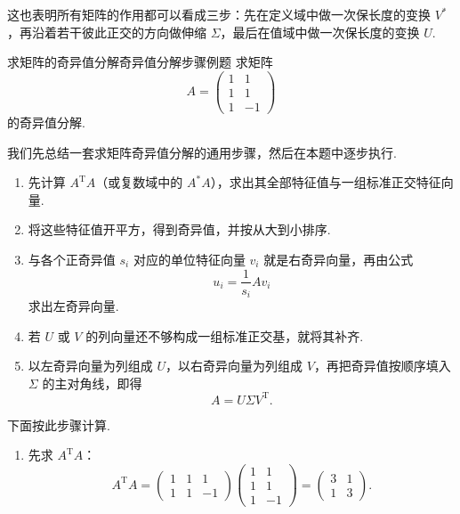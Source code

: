 这也表明所有矩阵的作用都可以看成三步：先在定义域中做一次保长度的变换 $ V^* $，再沿着若干彼此正交的方向做伸缩 $ \Sigma $，最后在值域中做一次保长度的变换 $ U $.

\begin{example}{求矩阵的奇异值分解}{奇异值分解步骤例题}
    求矩阵
    \[
        A = \begin{pmatrix}
            1 & 1  \\
            1 & 1  \\
            1 & -1
        \end{pmatrix}
    \]
    的奇异值分解.
\end{example}

\begin{solution}
    我们先总结一套求矩阵奇异值分解的通用步骤，然后在本题中逐步执行.

    \begin{enumerate}
        \item 先计算 $ A^{\mathrm{T}}A $（或复数域中的 $ A^*A $），求出其全部特征值与一组标准正交特征向量.

        \item 将这些特征值开平方，得到奇异值，并按从大到小排序.

        \item 与各个正奇异值 $ s_i $ 对应的单位特征向量 $ v_i $ 就是右奇异向量，再由公式
              \[
                  u_i = \frac{1}{s_i}Av_i
              \]
              求出左奇异向量.

        \item 若 $ U $ 或 $ V $ 的列向量还不够构成一组标准正交基，就将其补齐.

        \item 以左奇异向量为列组成 $ U $，以右奇异向量为列组成 $ V $，再把奇异值按顺序填入 $ \Sigma $ 的主对角线，即得
              \[
                  A = U\Sigma V^{\mathrm{T}}.
              \]
    \end{enumerate}

    下面按此步骤计算.

    \begin{enumerate}
        \item 先求 $ A^{\mathrm{T}}A $：
              \[
                  A^{\mathrm{T}}A =
                  \begin{pmatrix}
                      1 & 1 & 1  \\
                      1 & 1 & -1
                  \end{pmatrix}
                  \begin{pmatrix}
                      1 & 1  \\
                      1 & 1  \\
                      1 & -1
                  \end{pmatrix}
                  =
                  \begin{pmatrix}
                      3 & 1 \\
                      1 & 3
                  \end{pmatrix}.
              \]


\end{enumerate}
\end{solution}
